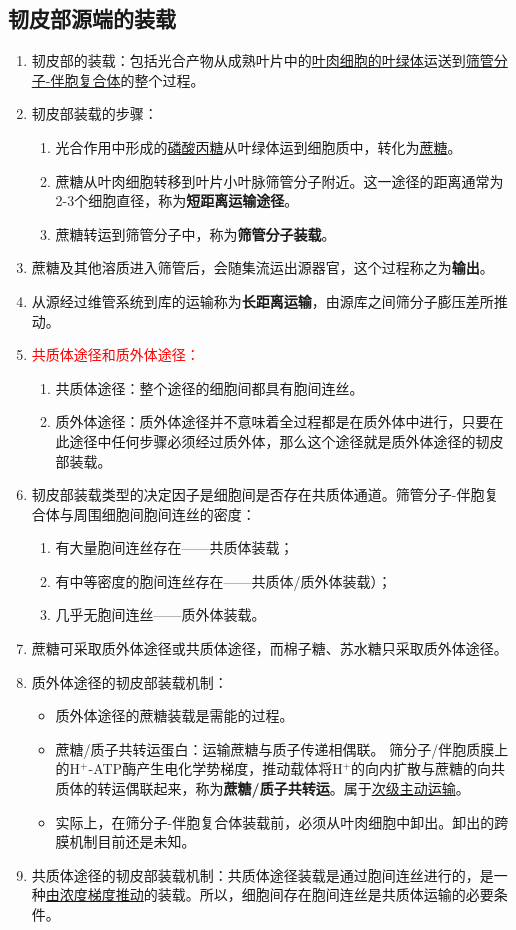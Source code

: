 \subsection{韧皮部源端的装载}
\begin{enumerate}
    \item 韧皮部的装载：包括光合产物从成熟叶片中的\uline{叶肉细胞的叶绿体}运送到\uline{筛管分子-伴胞复合体}的整个过程。
    \item 韧皮部装载的步骤：
    \begin{enumerate}
        \item 光合作用中形成的\uline{磷酸丙糖}从叶绿体运到细胞质中，转化为\uline{蔗糖}。
        \item 蔗糖从叶肉细胞转移到叶片小叶脉筛管分子附近。这一途径的距离通常为2-3个细胞直径，称为\textbf{短距离运输途径}。
        \item 蔗糖转运到筛管分子中，称为\textbf{筛管分子装载}。
    \end{enumerate}
    \item 蔗糖及其他溶质进入筛管后，会随集流运出源器官，这个过程称之为\textbf{输出}。
    \item 从源经过维管系统到库的运输称为\textbf{长距离运输}，由源库之间筛分子膨压差所推动。
    \item \textcolor{red}{共质体途径和质外体途径：}
    \begin{enumerate}
        \item 共质体途径：整个途径的细胞间都具有胞间连丝。
        \item 质外体途径：质外体途径并不意味着全过程都是在质外体中进行，只要在此途径中任何步骤必须经过质外体，那么这个途径就是质外体途径的韧皮部装载。
    \end{enumerate}
    \item 韧皮部装载类型的决定因子是细胞间是否存在共质体通道。筛管分子-伴胞复合体与周围细胞间胞间连丝的密度：
    \begin{enumerate}
        \item 有大量胞间连丝存在——共质体装载；
        \item 有中等密度的胞间连丝存在——共质体/质外体装载）；
        \item 几乎无胞间连丝——质外体装载。
    \end{enumerate}
    \item 蔗糖可采取质外体途径或共质体途径，而棉子糖、苏水糖只采取质外体途径。
    \item 质外体途径的韧皮部装载机制：
    \begin{itemize}
        \item 质外体途径的蔗糖装载是需能的过程。
        \item 蔗糖/质子共转运蛋白：运输蔗糖与质子传递相偶联。 筛分子/伴胞质膜上的H$^+$-ATP酶产生电化学势梯度，推动载体将H$^+$的向内扩散与蔗糖的向共质体的转运偶联起来，称为\textbf{蔗糖/质子共转运}。属于\uline{次级主动运输}。
        \item 实际上，在筛分子-伴胞复合体装载前，必须从叶肉细胞中卸出。卸出的跨膜机制目前还是未知。
    \end{itemize}
    \item 共质体途径的韧皮部装载机制：共质体途径装载是通过胞间连丝进行的，是一种\uline{由浓度梯度推动}的装载。所以，细胞间存在胞间连丝是共质体运输的必要条件。
\end{enumerate}
